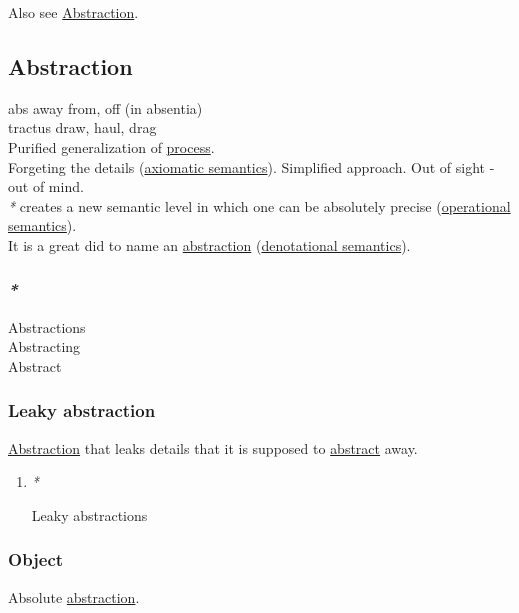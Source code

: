 \documentclass[a4paper,14pt,oneside]{book}
\begin{document}
Also see \hyperref[org4b78719]{Abstraction}.\\

\subsection{\label{org4b78719}Abstraction}
\label{sec:org5d7a732}
abs away from, off (in absentia)\\
tractus draw, haul, drag\\

Purified generalization of \hyperref[orgfdfd3f6]{process}.\\

Forgeting the details (\hyperref[org03522eb]{axiomatic semantics}). Simplified approach. Out of sight - out of mind.\\

\emph{*} creates a new semantic level in which one can be absolutely precise (\hyperref[org8164710]{operational semantics}).\\

It is a great did to name an \hyperref[org4b78719]{abstraction} (\hyperref[org0b4d230]{denotational semantics}).\\

\subsubsection{\emph{*}}
\label{sec:orgded714b}

\label{org8f72626}Abstractions\\
\label{org538daae}Abstracting\\
\label{orgb380e49}Abstract\\

\subsubsection{\label{orgc6aee02}Leaky abstraction}
\label{sec:org0a3be77}
\hyperref[org4b78719]{Abstraction} that leaks details that it is supposed to \hyperref[orgb380e49]{abstract} away.\\

\begin{enumerate}
\item \emph{*}
\label{sec:org36f6bab}

\label{org2052872}Leaky abstractions\\
\end{enumerate}

\subsubsection{\label{org75b9876}Object}
\label{sec:orgb52faa7}
Absolute \hyperref[org4b78719]{abstraction}.\\
\end{document}
